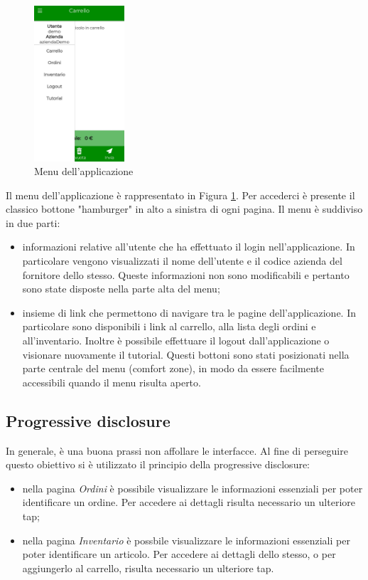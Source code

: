 \documentclass[12pt, a4paper, titlepage]{report}
\begin{document}
	\begin{figure}[H] 
		\centering
		\includegraphics[width=0.3\textwidth]{img/menu}
		\caption{Menu dell'applicazione}
		\label{fig:menu}
	\end{figure}
	Il menu dell'applicazione è rappresentato in Figura \ref{fig:menu}. Per accederci è presente il classico bottone "hamburger" in alto a sinistra di ogni pagina. Il menu è suddiviso in due parti: 
	\begin{itemize}
		\item informazioni relative all'utente che ha effettuato il login nell'applicazione. In particolare vengono visualizzati il nome dell'utente e il codice azienda del fornitore dello stesso. Queste informazioni non sono modificabili e pertanto sono state disposte nella parte alta del menu;
		\item insieme di link che permettono di navigare tra le pagine dell'applicazione. In particolare sono disponibili i link al carrello, alla lista degli ordini e all'inventario. Inoltre è possibile effettuare il logout dall'applicazione o visionare nuovamente il tutorial. Questi bottoni sono stati posizionati nella parte centrale del menu (comfort zone), in modo da essere facilmente accessibili quando il menu risulta aperto.
	\end{itemize}

	\subsection{Progressive disclosure}
	
	In generale, è una buona prassi non affollare le interfacce. Al fine di perseguire questo obiettivo si è utilizzato il principio della progressive disclosure:
	\begin{itemize}
		\item nella pagina \textit{Ordini} è possibile visualizzare le informazioni essenziali per poter identificare un ordine. Per accedere ai dettagli risulta necessario un ulteriore tap;
		\item nella pagina \textit{Inventario} è possbile visualizzare le informazioni essenziali per poter identificare un articolo. Per accedere ai dettagli dello stesso, o per aggiungerlo al carrello, risulta necessario un ulteriore tap.
	\end{itemize}
	
\end{document}
